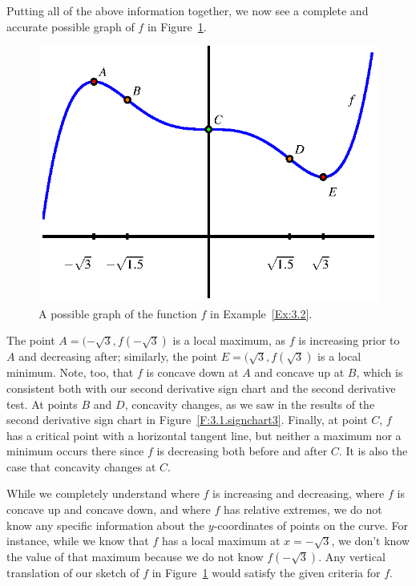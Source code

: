 Putting all of the above information together, we now see a complete and accurate possible graph of $f$ in Figure~\ref{F:3.1.Ex2}.  
\begin{figure}[h]
\begin{center}
\includegraphics{figures/3_1_Ex2.eps}
\caption{A possible graph of the function $f$ in Example~\ref{Ex:3.2}.} \label{F:3.1.Ex2}
\end{center}
\end{figure}
The point $A = (-\sqrt{3}, f(-\sqrt{3})$ is a local maximum, as $f$ is increasing prior to $A$ and decreasing after; similarly, the point $E = (\sqrt{3}, f(\sqrt{3})$ is a local minimum.  Note, too, that $f$ is concave down at $A$ and concave up at $B$, which is consistent both with our second derivative sign chart and the second derivative test.  At points $B$ and $D$, concavity changes, as we saw in the results of the second derivative sign chart in Figure~\ref{F:3.1.signchart3}.  Finally, at point $C$, $f$ has a critical point with a horizontal tangent line, but neither a maximum nor a minimum occurs there since $f$ is decreasing both before and after $C$.  It is also the case that concavity changes at $C$.

While we completely understand where $f$ is increasing and decreasing, where $f$ is concave up and concave down, and where $f$ has relative extremes, we do not know any specific information about the $y$-coordinates of points on the curve.  For instance, while we know that $f$ has a local maximum at $x = -\sqrt{3}$, we don't know the value of that maximum because we do not know $f(-\sqrt{3})$.  Any vertical translation of our sketch of $f$ in Figure~\ref{F:3.1.Ex2} would satisfy the given criteria for $f$.


